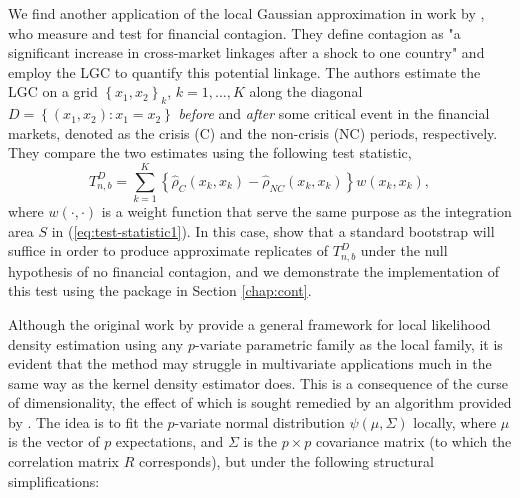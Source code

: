We find another application of the local Gaussian approximation in work by \citet{stov:tjos:huft:2014}, who measure and test for financial contagion. They define contagion as "a significant increase in cross-market linkages after a shock to one country" \citep[p. 2223]{forb:rigo:2002} and employ the LGC to quantify this potential linkage. The authors estimate the LGC on a grid $\left\{x_1, x_2\right\}_k$, $k=1,\ldots,K$ along the diagonal $D=\left\{\left(x_1,x_2\right): x_1 = x_2\right\}$ \emph{before} and \emph{after} some critical event in the financial markets, denoted as the crisis (C) and the non-crisis (NC) periods, respectively. They compare the two estimates using the following test statistic, 
$$T_{n,b}^D = \sum_{k=1}^K \left\{\widehat\rho_C\left(x_k, x_k\right) - \widehat\rho_{NC}\left(x_k, x_k\right) \right\}w\left(x_k,x_k\right),$$
where $w\left(\cdot, \cdot\right)$ is a weight function that serve the same purpose as the integration area $S$ in (\ref{eq:test-statistic1}). In this case, \citet{stov:tjos:huft:2014} show that a standard bootstrap will suffice in order to produce approximate replicates of $T_{n,b}^D$ under the null hypothesis of no financial contagion, and we demonstrate the implementation of this test using the  package in Section \ref{chap:cont}.

Although the original work by \citet{hjor:jone:1996} provide a general framework for local likelihood density estimation using any $p$-variate parametric family as the local family, it is evident that the method may struggle in multivariate applications much in the same way as the kernel density estimator does. This is a consequence of the curse of dimensionality, the effect of which is sought remedied by an algorithm provided by \citet{otne:tjos:2017}. The idea is to fit the $p$-variate normal distribution $\psi\left(\mu, \Sigma\right)$ locally, where $\mu$ is the vector of $p$ expectations, and $\Sigma$ is the $p\times p$ covariance matrix (to which the correlation matrix $R$ corresponds), but under the following structural simplifications:

